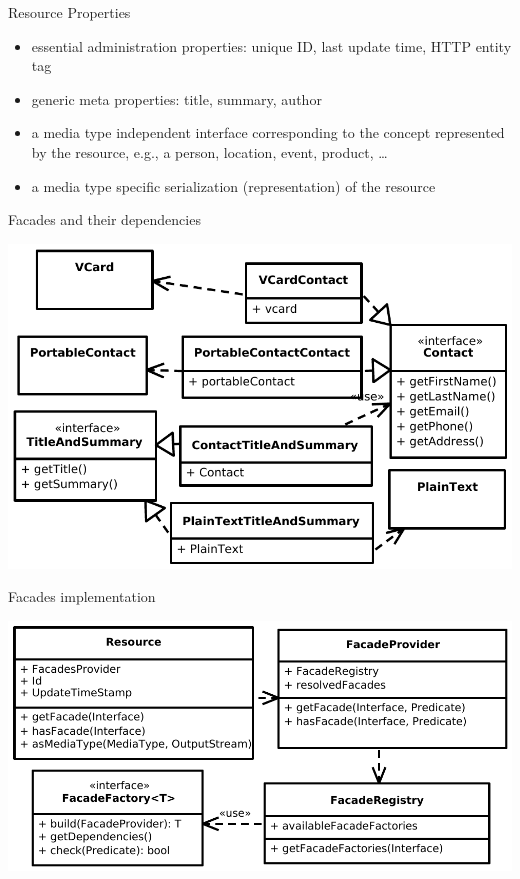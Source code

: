 \documentclass{beamer}
\begin{document}
\begin{frame}{Resource Properties}
\begin{itemize}
\item essential administration properties: unique ID, last update time, HTTP
  entity tag
\item generic meta properties: title, summary, author
\item a media type independent interface corresponding to the concept represented
  by the resource, e.g., a person, location, event, product, \ldots
\item a media type specific serialization (representation) of the resource
\end{itemize}

\end{frame}

\begin{frame}{Facades and their dependencies}
  \begin{center}
    \includegraphics[width=1\textwidth]{images/titleandsummary}
  \end{center}
\end{frame}

\begin{frame}{Facades implementation}
  \begin{center}
    \includegraphics[width=1\textwidth]{images/resourcefacades}
  \end{center}
\end{frame}
\end{document}
